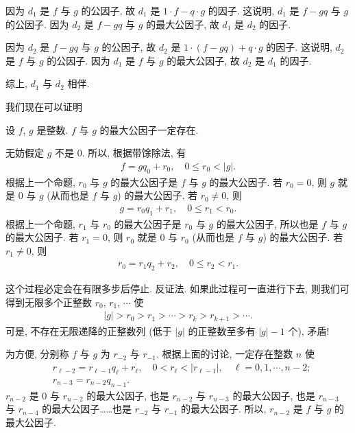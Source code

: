 \begin{pf}
    因为 $d_1$ 是 $f$ 与 $g$ 的公因子, 故 $d_1$ 是 $1 \cdot f - q \cdot g$ 的因子. 这说明, $d_1$ 是 $f - gq$ 与 $g$ 的公因子. 因为 $d_2$ 是 $f - gq$ 与 $g$ 的最大公因子, 故 $d_1$ 是 $d_2$ 的因子.

    因为 $d_2$ 是 $f - gq$ 与 $g$ 的公因子, 故 $d_2$ 是 $1 \cdot (f - gq) + q \cdot g$ 的因子. 这说明, $d_2$ 是 $f$ 与 $g$ 的公因子. 因为 $d_1$ 是 $f$ 与 $g$ 的最大公因子, 故 $d_2$ 是 $d_1$ 的因子.

    综上, $d_1$ 与 $d_2$ 相伴.
\end{pf}

我们现在可以证明
\begin{proposition}
    设 $f$, $g$ 是整数. $f$ 与 $g$ 的最大公因子一定存在.
\end{proposition}

\begin{pf}
    无妨假定 $g$ 不是 $0$. 所以, 根据带馀除法, 有
    \begin{align*}
        f = gq_0 + r_0, \quad 0 \leq r_0 < |g|.
    \end{align*}
    根据上一个命题, $r_0$ 与 $g$ 的最大公因子是 $f$ 与 $g$ 的最大公因子. 若 $r_0 = 0$, 则 $g$ 就是 $0$ 与 $g$ (从而也是 $f$ 与 $g$) 的最大公因子. 若 $r_0 \neq 0$, 则
    \begin{align*}
        g = r_0 q_1 + r_1, \quad 0 \leq r_1 < r_0.
    \end{align*}
    根据上一个命题, $r_1$ 与 $r_0$ 的最大公因子是 $r_0$ 与 $g$ 的最大公因子, 所以也是 $f$ 与 $g$ 的最大公因子. 若 $r_1 = 0$, 则 $r_0$ 就是 $0$ 与 $r_0$ (从而也是 $f$ 与 $g$) 的最大公因子. 若 $r_1 \neq 0$, 则
    \begin{align*}
        r_0 = r_1 q_2 + r_2, \quad 0 \leq r_2 < r_1.
    \end{align*}

    这个过程必定会在有限多步后停止. 反证法. 如果此过程可一直进行下去, 则我们可得到无限多个正整数 $r_0$, $r_1$, $\cdots$ 使
    \begin{align*}
        |g| > r_0 > r_1 > \cdots > r_k > r_{k+1} > \cdots.
    \end{align*}
    可是, 不存在无限递降的正整数列 (低于 $|g|$ 的正整数至多有 $|g| - 1$ 个), 矛盾!

    为方便, 分别称 $f$ 与 $g$ 为 $r_{-2}$ 与 $r_{-1}$. 根据上面的讨论, 一定存在整数 $n$ 使
    \begin{align*}
         & r_{\ell - 2} = r_{\ell - 1} q_{\ell} + r_{\ell}, \quad 0 < r_{\ell} < |r_{\ell - 1}|, \quad \ell = 0,1,\cdots,n-2; \\
         & r_{n - 3} = r_{n - 2} q_{n - 1}.
    \end{align*}
    $r_{n-2}$ 是 $0$ 与 $r_{n-2}$ 的最大公因子, 也是 $r_{n-2}$ 与 $r_{n-3}$ 的最大公因子, 也是 $r_{n-3}$ 与 $r_{n-4}$ 的最大公因子……也是 $r_{-2}$ 与 $r_{-1}$ 的最大公因子. 所以, $r_{n-2}$ 是 $f$ 与 $g$ 的最大公因子.
\end{pf}

